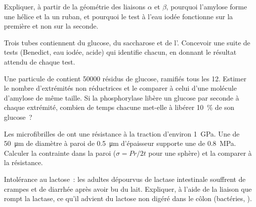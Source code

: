 \begin{exercise}[$\star\star$]\label{exo:b1:carbohydrates:5}
Expliquer, à partir de la géométrie des liaisons $\alpha$ et $\beta$,
pourquoi l'amylose forme une hélice et la  un ruban, et
pourquoi le test à l'eau iodée fonctionne sur la première et non sur la
seconde.
\end{exercise}

\begin{exercise}[$\star\star$]\label{exo:b1:carbohydrates:6}
Trois tubes contiennent du glucose, du saccharose et de l'.
Concevoir une suite de tests (Benedict, eau iodée,  acide) qui
identifie chacun, en donnant le résultat attendu de chaque test.
\end{exercise}

\begin{exercise}[$\star\star$]\label{exo:b1:carbohydrates:7}
Une particule de  contient \num{50000} résidus de glucose,
ramifiés tous les 12. Estimer le nombre d'extrémités non réductrices et
le comparer à celui d'une molécule d'amylose de même taille. Si la
phosphorylase libère un glucose par seconde à chaque extrémité, combien
de temps chacune met-elle à libérer \qty{10}{\%} de son glucose~?
\end{exercise}

\begin{exercise}[$\star\star$]\label{exo:b1:carbohydrates:8}
Les microfibrilles de  ont une résistance à la traction
d'environ \qty{1}{GPa}. Une  de \qty{50}{\micro m} de diamètre à
paroi de \qty{0.5}{\micro m} d'épaisseur supporte une  de
\qty{0.8}{MPa}. Calculer la contrainte dans la paroi ($\sigma = Pr/2t$
pour une sphère) et la comparer à la résistance.
\end{exercise}

\begin{exercise}[$\star\star$]\label{exo:b1:carbohydrates:9}
Intolérance au lactose~: les adultes dépourvus de lactase intestinale
souffrent de crampes et de diarrhée après avoir bu du lait. Expliquer,
à l'aide de la liaison que rompt la lactase, ce qu'il advient du lactose
non digéré dans le côlon (bactéries, ).
\end{exercise}

